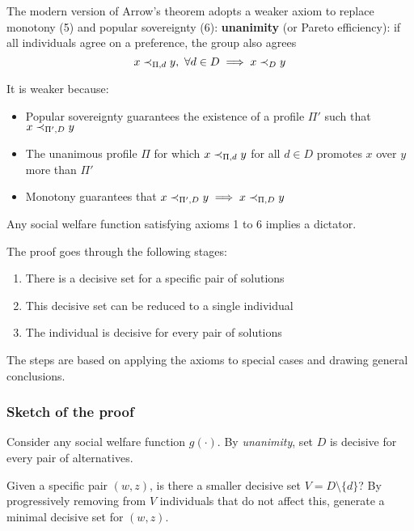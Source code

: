 The modern version of Arrow's theorem adopts a weaker axiom to replace monotony (5) and popular sovereignty (6): \textbf{unanimity} (or Pareto efficiency): if all individuals agree on a preference, the group also agrees
$$ x \prec_{\Pi, d} y, \ \forall d \in D \implies x \prec_{D} y $$

It is weaker because: 
\begin{itemize}
	\item Popular sovereignty guarantees the existence of a profile $\Pi'$ such that $x \prec_{\Pi', D} y$
	
	\item The unanimous profile $\Pi$ for which $x \prec_{\Pi, d} y$ for all $d \in D$ promotes $x$ over $y$ more than $\Pi'$
	
	\item Monotony guarantees that $x \prec_{\Pi', D} y \implies x \prec_{\Pi, D} y$ \\
\end{itemize}

\begin{theo}
	Any social welfare function satisfying axioms 1 to 6 implies a dictator.
\end{theo}

The proof goes through the following stages: 
\begin{enumerate}
	\item There is a decisive set for a specific pair of solutions
	
	\item This decisive set can be reduced to a single individual
	
	\item The individual is decisive for every pair of solutions
\end{enumerate}
The steps are based on applying the axioms to special cases and drawing general conclusions.

\subsubsection{Sketch of the proof}

Consider any social welfare function $g(\cdot)$. By \textit{unanimity}, set $D$ is decisive for every pair of alternatives.

Given a specific pair $(w, z)$, is there a smaller decisive set $V = D \setminus \{d\}$? By progressively removing from $V$ individuals that do not affect this, generate a minimal decisive set for $(w, z)$.

